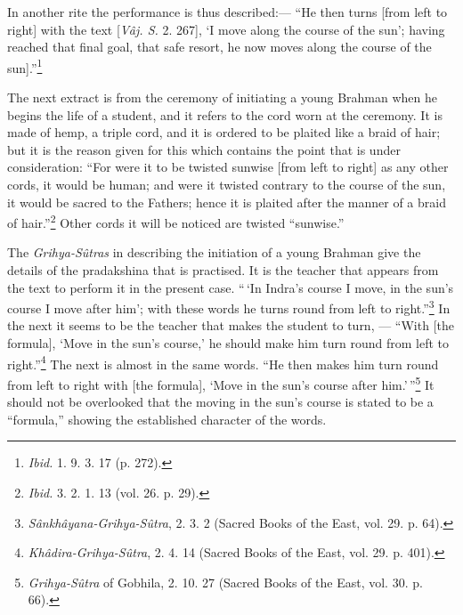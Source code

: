 \documentclass[a4paper, 11pt, oneside, polutonikogreek, english]{article}
\begin{document}
In another rite the performance is thus described:--- ``He then turns [from left to right] with the text [\emph{Vâj. S.} 2. 267], `I move along the course of the sun'; having reached that final goal, that safe resort, he now moves along the course of the sun].''\footnote{\emph{Ibid.} 1. 9. 3. 17 (p. 272).}

The next extract is from the ceremony of initiating a young Brahman when he begins the life of a student, and it refers to the cord worn at the ceremony. It is made of hemp, a triple cord, and it is ordered to be plaited like a braid of hair; but it is the reason given for this which contains the point that is under consideration: ``For were it to be twisted sunwise [from left to right] as any other cords, it would be human; and were it twisted contrary to the course of the sun, it would be sacred to the Fathers; hence it is plaited after the manner of a braid of hair.''\footnote{\emph{Ibid.} 3. 2. 1. 13 (vol. 26. p. 29).} Other cords it will be noticed are twisted ``sunwise.''

The \emph{Grihya-Sûtras} in describing the initiation of a young Brahman give the details of the pradakshina that is practised. It is the teacher that appears from the text to perform it in the present case. ``\,`In Indra's course I move, in the sun's course I move after him'; with these words he turns round from left to right.''\footnote{\emph{Sânkhâyana-Grihya-Sûtra}, 2. 3. 2 (Sacred Books of the East, vol. 29. p. 64).} In the next it seems to be the teacher that makes the student to turn, --- ``With [the formula], `Move in the sun's course,' he should make him turn round from left to right.''\footnote{\emph{Khâdira-Grihya-Sûtra}, 2. 4. 14 (Sacred Books of the East, vol. 29. p. 401).} The next is almost in the same words. ``He then makes him turn round from left to right with [the formula], `Move in the sun's course after him.'\,''\footnote{\emph{Grihya-Sûtra} of Gobhila, 2. 10. 27 (Sacred Books of the East, vol. 30. p. 66).} It should not be overlooked that the moving in the sun's course is stated to be a ``formula,'' showing the established character of the words.
\end{document}

